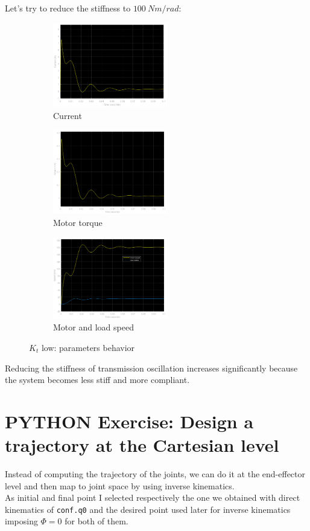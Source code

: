\documentclass[11pt,a4paper]{article}
\begin{document}
Let's try to reduce the stiffness to $100~Nm/rad$:
\begin{figure}[H]
	\begin{subfigure}[b]{0.3\textwidth}
		\includegraphics[width=50mm]{images/current2.png}
		\caption{Current}
	\end{subfigure}
	\hfill
	\begin{subfigure}[b]{0.3\textwidth}
		\includegraphics[width=50mm]{images/torque2.png}
		\caption{Motor torque}
	\end{subfigure}
	\hfill
	\begin{subfigure}[b]{0.3\textwidth}
		\includegraphics[width=50mm]{images/speed2.png}
		\caption{Motor and load speed}
	\end{subfigure}
	\caption{$K_t$ low: parameters behavior}
	\label{fig2}
\end{figure}
Reducing the stiffness of transmission oscillation increases significantly because the system becomes less stiff and more compliant. 
\section{PYTHON Exercise: Design a trajectory at the Cartesian level}	
Instead of computing the trajectory of the joints, we can do it at the end-effector level and then map to joint space by using inverse kinematics. \\
As initial and final point I selected respectively the one we obtained with direct kinematics of \texttt{conf.q0} and the desired point used later for inverse kinematics imposing $\Phi=0$ for both of them.
\end{document}
